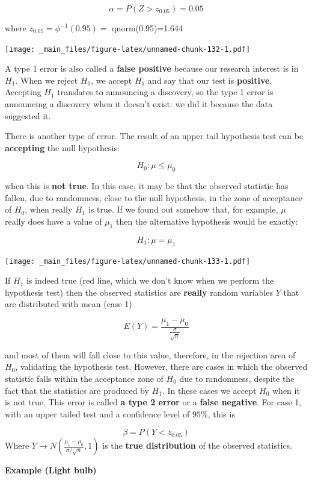 \documentclass[
]{book}
\begin{document}
\[\alpha = P(Z> z_{0.05})=0.05\]

where \(z_{0.05}=\phi^{-1}(0.95)=\) qnorm(0.95)=1.644

\texttt{[image: \_main\_files/figure-latex/unnamed-chunk-132-1.pdf]}

A type 1 error is also called a \textbf{false positive} because our research interest is in \(H_1\). When we reject \(H_0\), we accept \(H_1\) and say that our test is \textbf{positive}. Accepting \(H_1\) translates to announcing a discovery, so the type 1 error is announcing a discovery when it doesn't exist: we did it because the data suggested it.

There is another type of error. The result of an upper tail hypothesis test can be \textbf{accepting} the null hypothesis:

\[H_0: \mu\leq\mu_0\]

when this is \textbf{not true}. In this case, it may be that the observed statistic has fallen, due to randomness, close to the null hypothesis, in the zone of acceptance of \(H_0\), when really \(H_1\) is true. If we found out somehow that, for example, \(\mu\) really does have a value of \(\mu_1\) then the alternative hypothesis would be exactly:

\[H_1: \mu=\mu_1\]

\texttt{[image: \_main\_files/figure-latex/unnamed-chunk-133-1.pdf]}

If \(H_1\) is indeed true (red line, which we don't know when we perform the hypothesis test) then the observed statistics are \textbf{really} random variables \(Y\) that are distributed with mean (case 1)

\[E(Y)=\frac{\mu_1-\mu_0}{\frac{\sigma}{\sqrt{n}}}\]

and most of them will fall close to this value, therefore, in the rejection area of \(H_0\), validating the hypothesis test. However, there are cases in which the observed statistic falls within the acceptance zone of \(H_0\) due to randomness, despite the fact that the statistics are produced by \(H_1\). In these cases we accept \(H_0\) when it is not true. This error is called \textbf{a type 2 error} or a \textbf{false negative}. For case 1, with an upper tailed test and a confidence level of \(95\%\), this is

\[\beta= P(Y < z_{0.05})\]
Where \(Y \rightarrow N(\frac{\mu_1-\mu_0}{\sigma/\sqrt{n}},1)\) is the \textbf{true distribution} of the observed statistics.

\textbf{Example (Light bulb)}
\end{document}
